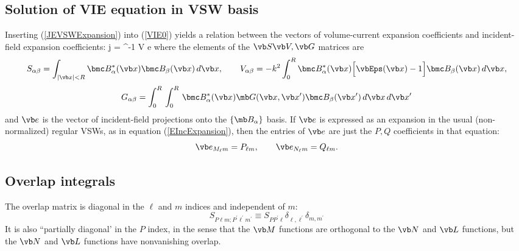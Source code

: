 \documentclass[letterpaper]{article}
\begin{document}
\subsection{Solution of VIE equation in VSW basis}

Inserting (\ref{JEVSWExpansion}) into (\ref{VIE0}) yields
a relation between the vectors of volume-current expansion
coefficients and incident-field expansion coefficients:
{
\vb j =  \Big[ \vb S + \vb V \vb G\Big]^{-1} \vb V \vb e
}
where the elements of the $\vb S \vb V, \vb G$ matrices are
$$ S_{\alpha\beta} = 
  \int_{|\vb x|<R} \bmc B_\alpha^*(\vb x) \bmc B_\beta(\vb x) \, d\vb x,
\qquad
   V_{\alpha\beta} = 
   -k^2 \int_0^R \bmc B_\alpha^*(\vb x)
   \Big[\vbEps(\vb x) - 1 \Big]\bmc B_\beta(\vb x)\,d\vb x,
$$
$$
   G_{\alpha\beta} = 
   \int_0^R \, \int_0^R \, \bmc B_\alpha^*(\vb x)
   \mb G(\vb x, \vb x^\prime)\bmc B_\beta(\vb x^\prime)\,d\vb x\,d\vb x^\prime
$$
and $\vb e$ is the vector of incident-field projections onto the
$\{\mb B_\alpha\}$ basis. If $\vb e$ is expressed as an expansion in 
the usual (non-normalized) regular VSWs, as in equation 
(\ref{EIncExpansion}), then the entries of $\vb e$ are just
the $P,Q$ coefficients in that equation:
$$ \vb e_{M_\ell m} = P_{\ell m}, 
   \qquad
   \vb e_{N_\ell m} = Q_{\ell m}.
$$

\subsection{Overlap integrals}

The overlap matrix is diagonal in the $\ell$ and $m$
indices and independent of $m$:
$$ S_{P\ell m; P^\prime \ell^\prime m^\prime} 
   \equiv S_{PP^\prime \ell}\delta_{\ell, \ell^\prime} \delta_{m,m^\prime}
$$
It is also ``partially diagonal' in the $P$ index, in the sense that the
$\vb M$ functions are orthogonal to the $\vb N$ and $\vb L$ functions,
but the $\vb N$ and $\vb L$ functions have nonvanishing overlap. 
\end{document}
